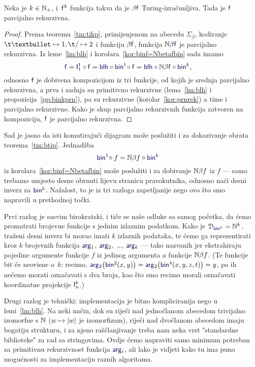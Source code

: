 \begin{teorem}\label{tm:btip}
Neka je $k\in{\mathbb N}_+$, i\, $\f f^k$\! funkcija takva da je $\beta\f f$ Turing-izračunljiva. Tada je $\f f$ parcijalno rekurzivna.
\end{teorem}
\begin{proof}
Prema teoremu~\ref{tm:tikp}, primijenjenom na abecedu $\Sigma_\beta$, kodiranje $\t\textbullet\mapsto1,\t/\mapsto2$ i funkciju $\beta\f f$, funkcija $\N\beta\f f$ je parcijalno rekurzivna. Iz leme~\ref{lm:blh} i korolara~\ref{kor:binf=Nbetafbin} sada imamo
\begin{equation}
    \f f=\f I_1^1\circ\f f=\f{blh}\circ\f{bin}^1\!\circ\f f=\f{blh}\circ\N\beta\f f\circ\f{bin}^k\text,
\end{equation}
odnosno $\f f$ je dobivena kompozicijom iz tri funkcije, od kojih je srednja parcijalno rekurzivna, a prva i zadnja su primitivno rekurzivne (lema~\ref{lm:blh} i propozicija~\ref{pp:binkprn}), pa su rekurzivne (korolar~\ref{kor:prnrek}) a time i parcijalno rekurzivne. Kako je skup parcijalno rekurzivnih funkcija zatvoren na kompoziciju, $\f f$ je parcijalno rekurzivna.
\end{proof}

Sad je jasno da isti komutirajući dijagram može poslužiti i za dokazivanje obrata teorema~\ref{tm:btip}. Jednadžba
\begin{equation}
    \f{bin}^1\!\circ f=\N\beta f\circ\f{bin}^k
\end{equation}
iz korolara~\ref{kor:binf=Nbetafbin} može poslužiti i za dobivanje ${\mathbb N}\beta f$ iz $f$ --- samo trebamo umjesto desne obrnuti lijevu stranicu pravokutnika, odnosno naći desni inverz za $\f{bin}^k$. Nažalost, to je iz tri razloga zapetljanije nego ovo što smo napravili u prethodnoj točki.

Prvi razlog je sasvim birokratski, i tiče se naše odluke sa samog početka, da ćemo promatrati brojevne funkcije s jednim izlaznim podatkom. Kako je $\dom{\f{bin}^k}=\N^k$, traženi desni inverz bi morao imati $k$ izlaznih podataka, te ćemo ga reprezentirati kroz $k$ brojevnih funkcija $\f{arg}_1$, $\f{arg}_2$,~\ldots, $\f{arg}_k$ --- tako nazvanih jer ekstrahiraju pojedine argumente funkcije $f$ iz jedinog argumenta $a$ funkcije ${\mathbb N}\beta f$. (Te funkcije bit će neovisne o~$k$: recimo, $\f{arg}_2\bigl(\f{bin}^2(x,y)\bigr)=\f{arg}_2\bigl(\f{bin}^4(x,y,z,t)\bigr)=y$, pa ih nećemo morati označavati s dva broja, kao što smo recimo morali označavati koordinatne projekcije $\f I_n^k$.)

Drugi razlog je tehnički: implementacija je bitno kompliciranija nego u lemi~\ref{lm:blh}. Na neki način, dok su riječi nad jednočlanom abecedom trivijalno izomorfne s ${\mathbb N}$ ($w\mapsto\lvert w\rvert$ je izomorfizam), riječi nad dvočlanom abecedom imaju bogatiju strukturu, i za njeno raščlanjivanje treba nam neka vrst "standardne biblioteke" za rad sa stringovima. Ovdje ćemo napraviti samo minimum potreban za primitivnu rekurzivnost funkcija $\f{arg}_i$, ali lako je vidjeti kako tu ima puno mogućnosti za implementaciju raznih algoritama.

